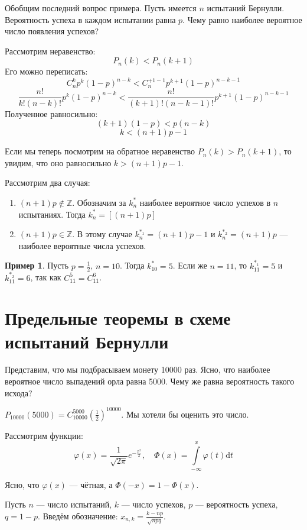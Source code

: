 \documentclass[11pt,openany,a4paper]{scrartcl}
\theoremstyle{plain}
\theoremstyle{definition}
\newtheorem{example}[theorem]{Пример}
\newcommand\mb{\mathbb}
\begin{document}
Обобщим последний вопрос примера.
Пусть имеется $n$ испытаний Бернулли. Вероятность успеха в каждом испытании равна $p$.
Чему равно наиболее вероятное число появления успехов?

Рассмотрим неравенство: 
$$
P_n(k) < P_n(k+1)
$$
Его можно переписать:
$$
C_n^k p^k(1-p)^{n-k} < C_n^{+1-1} p^{k+1} (1-p)^{n-k-1}
$$
$$
\frac{n!}{k! (n-k)!} p^k (1-p)^{n-k} < \frac{n!}{(k+1)!(n-k-1)!} p^{k+1}(1-p)^{n-k-1}
$$
Полученное равносильно:
$$
(k+1)(1-p) < p(n-k)
$$
$$
k < (n+1)p - 1
$$

Если мы теперь посмотрим на обратное неравенство $P_n(k) > P_n(k+1)$, то увидим, что
оно равносильно $k > (n+1)p - 1$.

Рассмотрим два случая:
\begin{enumerate}
    \item $(n+1)p \notin \mb Z$. Обозначим за $k_n^\ast$ наиболее вероятное число
    успехов в $n$ испытаниях. Тогда $k_n^\ast=[(n+1)p]$
    \item $(n+1)p \in \mb Z$. В этому случае $k_n^{\ast_1} = (n+1)p - 1$ и
    $k_n^{\ast_2} = (n+1)p$ — наиболее вероятные числа успехов.
\end{enumerate}

\begin{example}
    Пусть $p = \frac{1}{2}$, $n = 10$. Тогда $k_{10}^\ast = 5$. Если же $n = 11$, то
    $k_{11}^{\ast_1} = 5$ и $k_{11}^{\ast_2} = 6$, так как $C_{11}^5 = C_{11}^6$.
\end{example}

\section{Предельные теоремы в схеме испытаний Бернулли}

Представим, что мы подбрасываем монету 10000 раз. Ясно, что наиболее вероятное число 
выпадений орла равна 5000. Чему же равна вероятность такого исхода?

$P_{10000}(5000) = C_{10000}^{5000}(\frac{1}{2})^{10000}$. Мы хотели бы оценить это 
число.

Рассмотрим функции:
$$
\varphi(x) = \frac{1}{\sqrt{2\pi}}e^{-\frac{x^2}{2}},
\quad \Phi(x) = \int\limits_{-\infty}^x \varphi(t)\mathrm dt
$$

Ясно, что $\varphi(x)$ — чётная, а $\Phi(-x) = 1 -\Phi(x)$.

Пусть $n$ — число испытаний, $k$ — число успехов, $p$ — вероятность успеха, $q=1-p$.
Введём обозначение: $x_{n,k} = \frac{k - np}{\sqrt{npq}}$.
\end{document}
